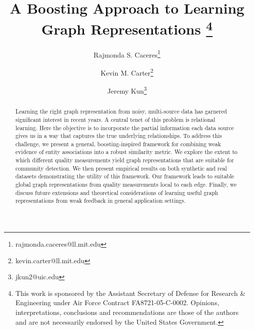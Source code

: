\documentclass[twoside,twocolumn]{article}
\begin{document}
\title{A Boosting Approach to Learning Graph Representations \thanks{This work
is sponsored by the Assistant Secretary of Defense for Research \& Engineering
under Air Force Contract FA8721-05-C-0002.  Opinions, interpretations,
conclusions and recommendations are those of the authors and are not
necessarily endorsed by the United States Government.}}
\author[1]{Rajmonda S. Caceres\thanks{ rajmonda.caceres@ll.mit.edu}}
\author[1]{Kevin M. Carter\thanks{kevin.carter@ll.mit.edu}}
\author[1,2]{Jeremy Kun\thanks{jkun2@uic.edu}} 


\date{}

\maketitle

\begin{abstract} \small \baselineskip=9pt 
Learning the right graph representation from noisy, multi-source data has
garnered significant interest in recent years. A central tenet of this problem
is relational learning. Here the objective is to incorporate the partial information each data source gives us
in a way that captures the true underlying relationships. To address this
challenge, we present a general, boosting-inspired framework for combining weak
evidence of entity associations into a robust similarity metric. We explore the
extent to which different quality measurements yield graph representations that
are suitable for community detection.  We then present empirical results on
both synthetic and real datasets demonstrating the utility of this framework.
Our framework leads to suitable global graph representations from quality
measurements local to each edge. Finally, we discuss future extensions and
theoretical considerations of learning useful graph representations from weak
feedback in general application settings.  \end{abstract}

 
 
\end{document}
